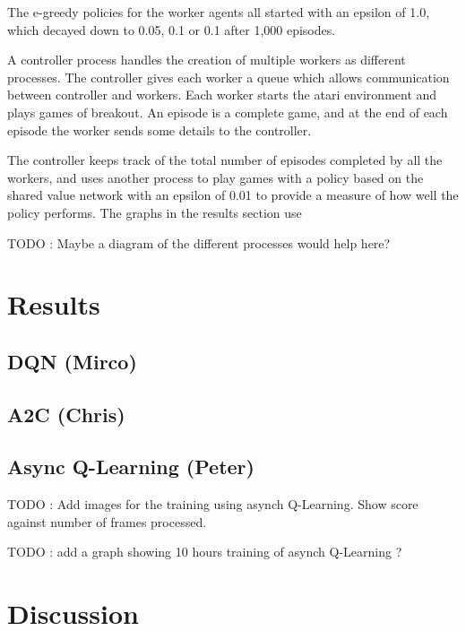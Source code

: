 \documentclass{article}
\begin{document}
The e-greedy policies for the worker agents all started with an epsilon of 1.0, which decayed down to 0.05, 0.1 or 0.1 after 1,000 episodes.

A controller process handles the creation of multiple workers as different processes.
The controller gives each worker a queue which allows communication between controller and workers.
Each worker starts the atari environment and plays games of breakout.
An episode is a complete game, and at the end of each episode the worker sends some details to the controller.

The controller keeps track of the total number of episodes completed by all the workers, and uses another process to play games with a policy based on the shared value network with an epsilon of 0.01 to provide a measure of how well the policy performs.
The graphs in the results section use

TODO : Maybe a diagram of the different processes would help here?


\section{Results}


\subsection{DQN (Mirco)}
\subsection{A2C (Chris)}
\subsection{Async Q-Learning (Peter)}

TODO : Add images for the training using asynch Q-Learning.
Show score against number of frames processed.

TODO : add a graph showing 10 hours training of asynch Q-Learning ?

\section{Discussion}
    
\end{document}
